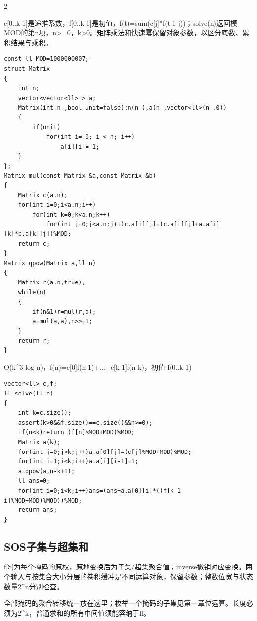 \documentclass[UTF8,fontset=fandol,a4paper,twoside]{ctexart}
\newcommand{\note}[1]{{\fontsize{10}{12}\selectfont #1\par}}
\begin{document}
\begin{multicols}{2}
\note{c[\allowbreak{}0.\allowbreak{}.\allowbreak{}k-\allowbreak{}1]\allowbreak{}是递推系数，f[\allowbreak{}0.\allowbreak{}.\allowbreak{}k-\allowbreak{}1]\allowbreak{}是初值，f(\allowbreak{}t)\allowbreak{}=\allowbreak{}sum(\allowbreak{}c[\allowbreak{}j]\allowbreak{}*f(\allowbreak{}t-\allowbreak{}1-\allowbreak{}j)\allowbreak{})\allowbreak{}；solve(\allowbreak{}n)\allowbreak{}返回模MOD的第n项，n>\allowbreak{}=\allowbreak{}0，k>\allowbreak{}0。矩阵乘法和快速幂保留对象参数，以区分底数、累积结果与乘积。}
\begin{lstlisting}
const ll MOD=1000000007;
struct Matrix
{
    int n;
    vector<vector<ll> > a;
    Matrix(int n_,bool unit=false):n(n_),a(n_,vector<ll>(n_,0))
    {
        if(unit)
            for(int i= 0; i < n; i++)
                a[i][i]= 1;
    }
};
Matrix mul(const Matrix &a,const Matrix &b)
{
    Matrix c(a.n);
    for(int i=0;i<a.n;i++)
        for(int k=0;k<a.n;k++)
            for(int j=0;j<a.n;j++)c.a[i][j]=(c.a[i][j]+a.a[i][k]*b.a[k][j])%MOD;
    return c;
}
Matrix qpow(Matrix a,ll n)
{
    Matrix r(a.n,true);
    while(n)
    {
        if(n&1)r=mul(r,a);
        a=mul(a,a),n>>=1;
    }
    return r;
}
\end{lstlisting}
\note{O(\allowbreak{}k\textasciicircum{}3 log n)\allowbreak{}，f(\allowbreak{}n)\allowbreak{}=\allowbreak{}c[\allowbreak{}0]\allowbreak{}f(\allowbreak{}n-\allowbreak{}1)\allowbreak{}+\allowbreak{}.\allowbreak{}.\allowbreak{}.\allowbreak{}+\allowbreak{}c[\allowbreak{}k-\allowbreak{}1]\allowbreak{}f(\allowbreak{}n-\allowbreak{}k)\allowbreak{}，初值 f(\allowbreak{}0.\allowbreak{}.\allowbreak{}k-\allowbreak{}1)\allowbreak{}}
\begin{lstlisting}
vector<ll> c,f;
ll solve(ll n)
{
    int k=c.size();
    assert(k>0&&f.size()==c.size()&&n>=0);
    if(n<k)return (f[n]%MOD+MOD)%MOD;
    Matrix a(k);
    for(int j=0;j<k;j++)a.a[0][j]=(c[j]%MOD+MOD)%MOD;
    for(int i=1;i<k;i++)a.a[i][i-1]=1;
    a=qpow(a,n-k+1);
    ll ans=0;
    for(int i=0;i<k;i++)ans=(ans+a.a[0][i]*((f[k-1-i]%MOD+MOD)%MOD))%MOD;
    return ans;
}
\end{lstlisting}
\subsection{SOS子集与超集和}

\note{f[\allowbreak{}S]\allowbreak{}为每个掩码的原权，原地变换后为子集/\allowbreak{}超集聚合值；inverse撤销对应变换。两个输入与按集合大小分层的卷积缓冲是不同运算对象，保留参数；整数位宽与状态数量2\textasciicircum{}n分别检查。}
\note{全部掩码的聚合转移统一放在这里；枚举一个掩码的子集见第一章位运算。长度必须为2\textasciicircum{}k，普通求和的所有中间值须能容纳于ll。}
\begin{lstlisting}


\end{lstlisting}
\end{multicols}
\end{document}
